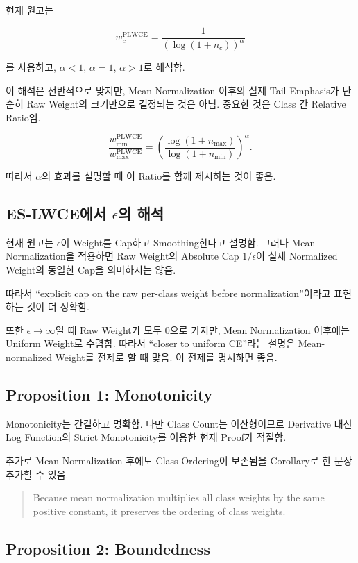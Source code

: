 \documentclass[11pt,a4paper]{article}
\begin{document}
현재 원고는

\[
w_c^{\mathrm{PLWCE}}
=
\frac{1}{\left(\log(1+n_c)\right)^\alpha}
\]

를 사용하고, \(\alpha<1\), \(\alpha=1\), \(\alpha>1\)로 해석함.

이 해석은 전반적으로 맞지만, Mean Normalization 이후의 실제 Tail Emphasis가 단순히 Raw Weight의 크기만으로 결정되는 것은 아님. 중요한 것은 Class 간 Relative Ratio임.

\[
\frac{w_{\min}^{\mathrm{PLWCE}}}{w_{\max}^{\mathrm{PLWCE}}}
=
\left(
\frac{\log(1+n_{\max})}{\log(1+n_{\min})}
\right)^\alpha.
\]

따라서 \(\alpha\)의 효과를 설명할 때 이 Ratio를 함께 제시하는 것이 좋음.

\subsection{ES-LWCE에서 \(\epsilon\)의 해석}

현재 원고는 \(\epsilon\)이 Weight를 Cap하고 Smoothing한다고 설명함. 그러나 Mean Normalization을 적용하면 Raw Weight의 Absolute Cap \(1/\epsilon\)이 실제 Normalized Weight의 동일한 Cap을 의미하지는 않음.

따라서 ``explicit cap on the raw per-class weight before normalization''이라고 표현하는 것이 더 정확함.

또한 \(\epsilon\to\infty\)일 때 Raw Weight가 모두 \(0\)으로 가지만, Mean Normalization 이후에는 Uniform Weight로 수렴함. 따라서 ``closer to uniform CE''라는 설명은 Mean-normalized Weight를 전제로 할 때 맞음. 이 전제를 명시하면 좋음.

\subsection{Proposition 1: Monotonicity}

Monotonicity는 간결하고 명확함. 다만 Class Count는 이산형이므로 Derivative 대신 Log Function의 Strict Monotonicity를 이용한 현재 Proof가 적절함.

추가로 Mean Normalization 후에도 Class Ordering이 보존됨을 Corollary로 한 문장 추가할 수 있음.

\begin{quote}
Because mean normalization multiplies all class weights by the same positive constant, it preserves the ordering of class weights.
\end{quote}

\subsection{Proposition 2: Boundedness}
\end{document}
